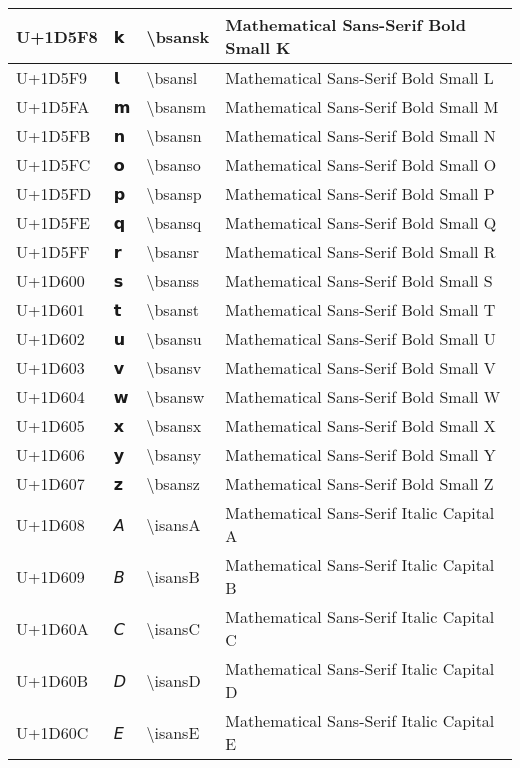 \begin{table}[h]
\begin{tabulary}{\linewidth}{|L|L|L|L|}
\hline
U+1D5F8 & 𝗸 & {\textbackslash}bsansk & Mathematical Sans-Serif Bold Small K \\
\hline
U+1D5F9 & 𝗹 & {\textbackslash}bsansl & Mathematical Sans-Serif Bold Small L \\
\hline
U+1D5FA & 𝗺 & {\textbackslash}bsansm & Mathematical Sans-Serif Bold Small M \\
\hline
U+1D5FB & 𝗻 & {\textbackslash}bsansn & Mathematical Sans-Serif Bold Small N \\
\hline
U+1D5FC & 𝗼 & {\textbackslash}bsanso & Mathematical Sans-Serif Bold Small O \\
\hline
U+1D5FD & 𝗽 & {\textbackslash}bsansp & Mathematical Sans-Serif Bold Small P \\
\hline
U+1D5FE & 𝗾 & {\textbackslash}bsansq & Mathematical Sans-Serif Bold Small Q \\
\hline
U+1D5FF & 𝗿 & {\textbackslash}bsansr & Mathematical Sans-Serif Bold Small R \\
\hline
U+1D600 & 𝘀 & {\textbackslash}bsanss & Mathematical Sans-Serif Bold Small S \\
\hline
U+1D601 & 𝘁 & {\textbackslash}bsanst & Mathematical Sans-Serif Bold Small T \\
\hline
U+1D602 & 𝘂 & {\textbackslash}bsansu & Mathematical Sans-Serif Bold Small U \\
\hline
U+1D603 & 𝘃 & {\textbackslash}bsansv & Mathematical Sans-Serif Bold Small V \\
\hline
U+1D604 & 𝘄 & {\textbackslash}bsansw & Mathematical Sans-Serif Bold Small W \\
\hline
U+1D605 & 𝘅 & {\textbackslash}bsansx & Mathematical Sans-Serif Bold Small X \\
\hline
U+1D606 & 𝘆 & {\textbackslash}bsansy & Mathematical Sans-Serif Bold Small Y \\
\hline
U+1D607 & 𝘇 & {\textbackslash}bsansz & Mathematical Sans-Serif Bold Small Z \\
\hline
U+1D608 & 𝘈 & {\textbackslash}isansA & Mathematical Sans-Serif Italic Capital A \\
\hline
U+1D609 & 𝘉 & {\textbackslash}isansB & Mathematical Sans-Serif Italic Capital B \\
\hline
U+1D60A & 𝘊 & {\textbackslash}isansC & Mathematical Sans-Serif Italic Capital C \\
\hline
U+1D60B & 𝘋 & {\textbackslash}isansD & Mathematical Sans-Serif Italic Capital D \\
\hline
U+1D60C & 𝘌 & {\textbackslash}isansE & Mathematical Sans-Serif Italic Capital E \\

\end{tabulary}
\end{table}
